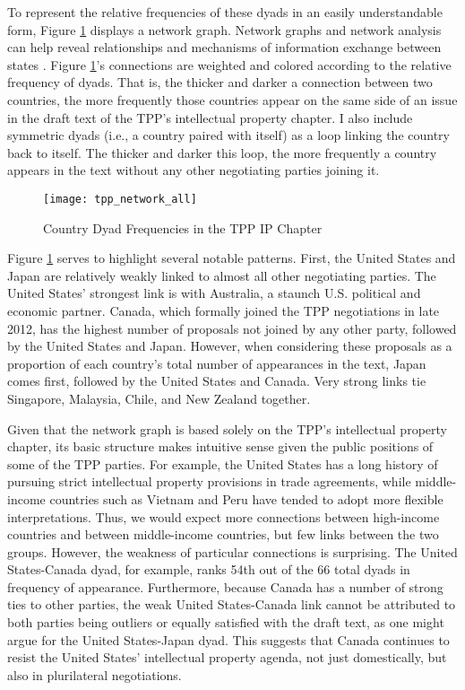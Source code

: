 \documentclass[12pt]{article}
\begin{document}
To represent the relative frequencies of these dyads in an easily understandable form, 
Figure \ref{fig_tpp_network_graph} displays a network graph. Network graphs and network analysis can help reveal relationships and 
mechanisms of 
information exchange between states \citep{kinne2013network}.
Figure \ref{fig_tpp_network_graph}'s connections are weighted and colored 
according to the 
relative frequency of dyads. That is, the thicker and darker a connection between 
two countries, the more frequently those countries appear on the same side of an issue in the draft 
text of the TPP's intellectual property chapter. I also include symmetric dyads (i.e., a country paired with itself) as a loop linking the 
country back to itself. The thicker and darker this loop, the more frequently a country appears in 
the text without any other negotiating parties joining it.

\begin{figure}
\caption{Country Dyad Frequencies in the TPP IP Chapter}
\label{fig_tpp_network_graph}
\centering
\texttt{[image: tpp\_network\_all]}
\end{figure}

Figure \ref{fig_tpp_network_graph} serves to highlight several notable patterns. First, the 
United States and Japan are relatively 
weakly linked to almost all other negotiating parties. The United States' strongest link is with 
Australia, a staunch U.S. political and economic partner. Canada, which formally joined the TPP 
negotiations in late 2012, has the highest number of proposals not joined by any other party, followed 
by the United States and Japan. However, when considering these proposals as a proportion of each 
country's total number of appearances in the text, Japan comes first, followed by the United States 
and Canada. Very strong links tie Singapore, Malaysia, Chile, and New Zealand together.

Given that the network graph is based solely on the TPP's intellectual property chapter, 
its basic structure makes intuitive sense given the public positions of some of the TPP parties. 
For example, the United States has a long history of pursuing strict intellectual property provisions 
in trade agreements, while middle-income countries such as Vietnam and Peru have tended to adopt more 
flexible interpretations. Thus, we would expect more connections between high-income countries and between 
middle-income countries, but few links between the two groups. However, the weakness of particular 
connections is surprising. The United States-Canada dyad, 
for example, ranks 54th out of the 66 total dyads in frequency of appearance. Furthermore, because Canada has a 
number of strong ties to other parties, the weak United States-Canada link cannot be attributed to 
both parties being outliers or equally satisfied with the draft text, as one might argue for the 
United States-Japan dyad. This suggests that Canada continues to resist the United States' intellectual property 
agenda, not just domestically, but also in plurilateral negotiations.
\end{document}
